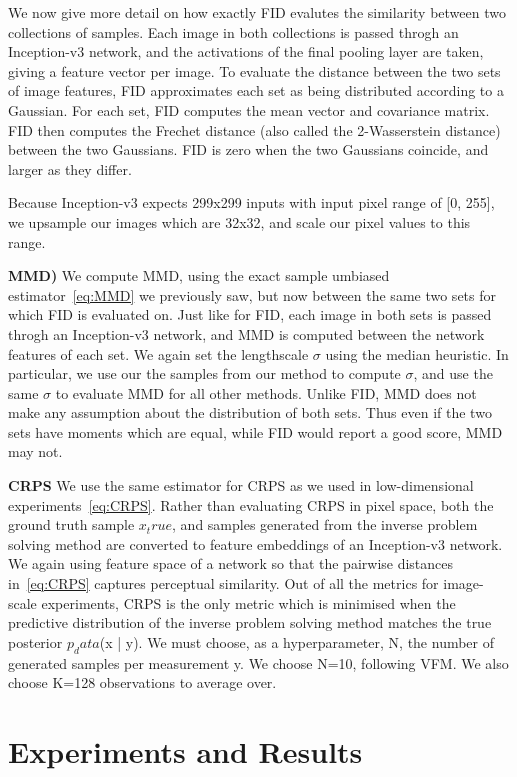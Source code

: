 \documentclass[12pt,a4paper]{report}
\begin{document}
We now give more detail on how exactly FID evalutes the similarity between two collections of samples. 
Each image in both collections is passed throgh an Inception-v3 network, and the activations of the final pooling layer are taken, giving a feature vector per image. 
To evaluate the distance between the two sets of image features, FID approximates each set as being distributed according to a Gaussian. 
For each set, FID computes the mean vector and covariance matrix. 
FID then computes the Frechet distance (also called the 2-Wasserstein distance) between the two Gaussians.
FID is zero when the two Gaussians coincide, and larger as they differ.

Because Inception-v3 expects 299x299 inputs with input pixel range of [0, 255], we upsample our images which are 32x32, and scale our pixel values to this range. 

\textbf{MMD)}
We compute MMD, using the exact sample umbiased estimator~\ref{eq:MMD} we previously saw, but now between the same two sets for which FID is evaluated on. 
Just like for FID, each image in both sets is passed throgh an Inception-v3 network, and MMD is computed between the network features of each set. 
We again set the lengthscale $\sigma$ using the median heuristic. 
In particular, we use our the samples from our method to compute $\sigma$, and use the same $\sigma$ to evaluate MMD for all other methods. 
Unlike FID, MMD does not make any assumption about the distribution of both sets. 
Thus even if the two sets have moments which are equal, while FID would report a good score, MMD may not. 

\textbf{CRPS}
We use the same estimator for CRPS as we used in low-dimensional experiments~\ref{eq:CRPS}. 
Rather than evaluating CRPS in pixel space, both the ground truth sample $x_true$, and samples generated from the inverse problem solving method are converted to feature embeddings of an Inception-v3 network. 
We again using feature space of a network so that the pairwise distances in~\ref{eq:CRPS} captures perceptual similarity. 
Out of all the metrics for image-scale experiments, CRPS is the only metric which is minimised when the predictive distribution of the inverse problem solving method matches the true posterior $p_data$(x | y). 
We must choose, as a hyperparameter, N, the number of generated samples per measurement y. 
We choose N=10, following VFM. 
We also choose K=128 observations to average over. 

\chapter{Experiments and Results}
\end{document}
